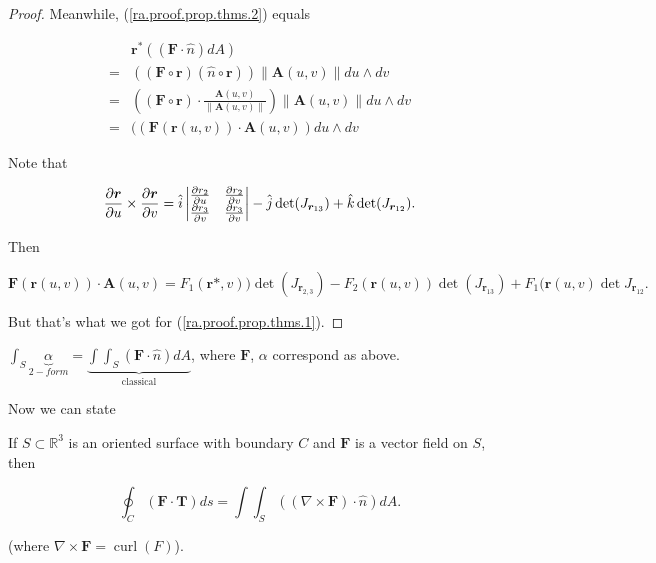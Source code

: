 \begin{proof}
Meanwhile, (\ref{ra.proof.prop.thms.2}) equals

\begin{align}
& \boldsymbol{r}^*((\boldsymbol{F} \cdot \hat{n}) dA)
\\ = & ( (\boldsymbol{F} \circ \boldsymbol{r})(\hat{n} \circ \boldsymbol{r})) \lVert \boldsymbol{A}(u,v) \rVert du \wedge dv
\\ = & ( (\boldsymbol{F} \circ \boldsymbol{r}) \cdot \frac{ \boldsymbol{A}(u,v) }{\lVert  \boldsymbol{A}(u,v)  \rVert}) \lVert \boldsymbol{A}(u,v) \rVert du \wedge dv
\\ = & ( (\boldsymbol{F} ( \boldsymbol{r}(u,v)) \cdot \boldsymbol{A}(u,v) ) du \wedge dv
\end{align}

Note that 

\[
\pderiv{\boldsymbol{r}}{u} \times \pderiv{\boldsymbol{r}}{v} = \hat{i} \begin{vmatrix} 
\pderiv{r_2}{u} & \pderiv{r_2}{v} \\
\pderiv{r_3}{v} & \pderiv{r_3}{v}
\end{vmatrix} - \hat{j} \operatorname{det}(J_{\boldsymbol{r}_{13}}) +  \hat{k} \operatorname{det}(J_{\boldsymbol{r}_{12}}) .
\]

Then

\[
\boldsymbol{F} ( \boldsymbol{r}(u,v)) \cdot \boldsymbol{A}(u,v)  = F_1(\boldsymbol{r}*,v)) \operatorname{det}(J_{\boldsymbol{r}_{2,3}}) - F_2(\boldsymbol{r}(u,v)) \operatorname{det}(J_{\boldsymbol{r}_{13}}) + F_1 (\boldsymbol{r}(u,v) \operatorname{det}J_{\boldsymbol{r}_{12}}.
\]

But that's what we got for (\ref{ra.proof.prop.thms.1}).

\end{proof}

\begin{corollary}

\( \int_S \underbrace{\alpha}_{2-form} = \underbrace{\int \int_S(\boldsymbol{F} \cdot \hat{n}) dA}_{\text{classical}}\), where \(\boldsymbol{F}\), \(\alpha\) correspond as above.

\end{corollary}

Now we can state

\begin{theorem}

If \(S \subset \mathbb{R}^3\) is an oriented surface with boundary \(C\) and \(\boldsymbol{F}\) is a vector field on \(S\), then

\[
\oint_C (\boldsymbol{F} \cdot \boldsymbol{T}) ds = \int \int_S ( (\nabla \times \boldsymbol{F}) \cdot \hat{n}) dA.
\]

(where \(\nabla \times \boldsymbol{F} = \operatorname{curl}(F)\)). 

\end{theorem}

